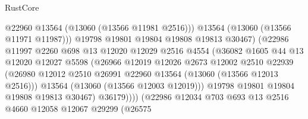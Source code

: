 \begin{lexlean}{RustCore}
\begin{coremodule}
                                      @22960
                                      @13564
                                      (@13060 (@13566 @11981 @2516)))
                                    @13564
                                    (@13060 (@13566 @11971 @11987)))
                                  @19798
                                  @19801
                                  @19804
                                  @19808
                                  @19813
                                  @30467)
                                (@22986
                                  @11997
                                  @2260
                                  @698
                                  @13
                                  @12020
                                  @12029
                                  @2516
                                  @4554
                                  (@36082
                                    @1605
                                    @44
                                    @13
                                    @12020
                                    @12027
                                    @5598
                                    (@26966
                                      @12019
                                      @12026
                                      @2673
                                      @12002
                                      @2510
                                      @22939
                                      (@26980
                                        @12012
                                        @2510
                                        @26991
                                        @22960
                                        @13564
                                        (@13060 (@13566 @12013 @2516)))
                                      @13564
                                      (@13060 (@13566 @12003 @12019)))
                                    @19798
                                    @19801
                                    @19804
                                    @19808
                                    @19813
                                    @30467)
                                  @36179))))
                          (@22986
                            @12034
                            @703
                            @693
                            @13
                            @2516
                            @4660
                            @12058
                            @12067
                            @29299
                            (@26575

\end{coremodule}
\end{lexlean}
